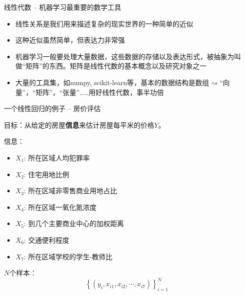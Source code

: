 \begin{frame}{线性代数 -- 机器学习最重要的数学工具}

\begin{itemize}
\item<2-> 线性关系是我们用来描述复杂的现实世界的一种简单的近似
\item<3-> 这种近似虽然简单，但表达力非常强
\item<4-> 机器学习一般要处理大量数据，这些数据的存储以及表达形式，被抽象为叫做``矩阵''的东西。矩阵是线性代数的基本概念以及研究对象之一
\item<5-> 大量的工具集，如numpy, scikit-learn等，基本的数据结构是数组$\rightsquigarrow$``向量''，``矩阵''，``张量''\ldots\ldots 用好线性代数，事半功倍
\end{itemize}

\end{frame}


\begin{frame}{一个线性回归的例子 -- 房价评估}

目标：从给定的房屋{\bfseries 信息}来估计房屋每平米的价格$Y$。

\pause

信息：
\begin{itemize}
\item $X_1$: 所在区域人均犯罪率
\item $X_2$: 住宅用地比例
\item $X_3$: 所在区域非零售商业用地占比
\item $X_4$: 所在区域一氧化氮浓度
\item $X_5$: 到几个主要商业中心的加权距离
\item $X_6$: 交通便利程度
\item $X_7$: 所在区域学校的学生-教师比
\end{itemize}

\pause

$N$个样本：
$$\left\{(y_i, x_{i1}, x_{i2}, \cdots, x_{i7}) \right\}_{i=1}^N$$

\end{frame}


